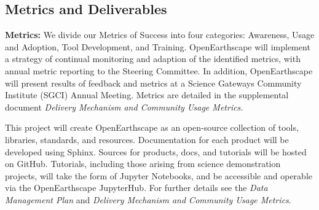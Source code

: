 



\subsection{Metrics and Deliverables}

\textbf{Metrics:} We divide our Metrics of Success into four categories: Awareness, Usage and Adoption, Tool Development, and Training. OpenEarthscape will implement a strategy of continual monitoring and adaption of the identified metrics, with annual metric reporting to the Steering Committee. In addition, OpenEarthscape will present results of feedback and metrics at a Science Gateways Community Institute (SGCI) Annual Meeting. Metrics are detailed in the supplemental document \textit{Delivery Mechanism and Community Usage Metrics.}

 This project will create OpenEarthscape as an open-source collection of tools, libraries, standards, and resources. %
Documentation for each product will be developed using Sphinx. Sources for products, docs, and tutorials will be hosted on GitHub. Tutorials, including those arising from science demonstration projects, will take the form of Jupyter Notebooks, and be accessible and operable via the OpenEarthscape JupyterHub. For further details see the \textit{Data Management Plan} and \textit{Delivery Mechanism and Community Usage Metrics}.




